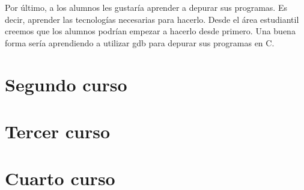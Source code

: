 Por último, a los alumnos les gustaría aprender a depurar sus programas.
Es decir, aprender las tecnologías necesarias para hacerlo.
Desde el área estudiantil creemos que los alumnos podrían empezar a
hacerlo desde primero.
Una buena forma sería
aprendiendo a utilizar gdb para depurar sus programas en C.

\section{Segundo curso}

\section{Tercer curso}

\section{Cuarto curso}

